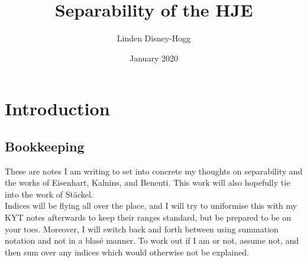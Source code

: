 \documentclass{article}
\title{Separability of the HJE}
\author{Linden Disney-Hogg}
\date{January 2020}
\begin{document}
\maketitle
\tableofcontents

\section{Introduction}
\subsection{Bookkeeping}
These are notes I am writing to set into concrete my thoughts on separability and the works of Eisenhart, Kalnins, and Benenti. This work will also hopefully tie into the work of St\"ackel. \\
Indices will be flying all over the place, and I will try to uniformise this with my KYT notes afterwards to keep their ranges standard, but be prepared to be on your toes. Moreover, I will switch back and forth between using summation notation and not in a blas\'e manner. To work out if I am or not, assume not, and then sum over any indices which would otherwise not be explained. 
\end{document}
